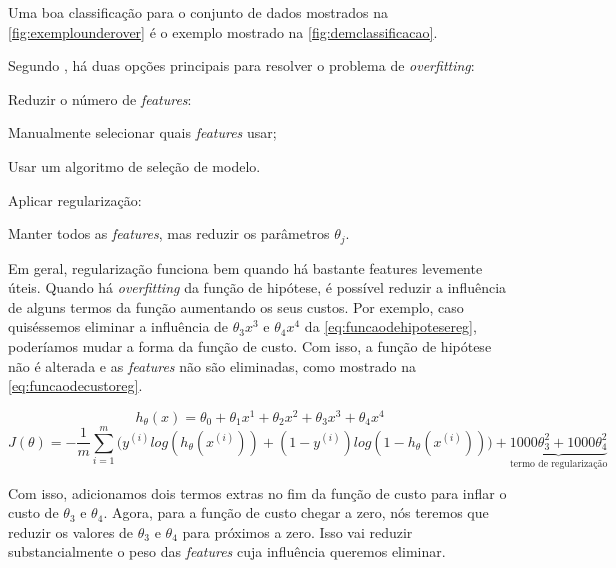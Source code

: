 Uma boa classificação para o conjunto de dados mostrados na \autoref{fig:exemplounderover} é o exemplo mostrado na \autoref{fig:demclassificacao}.

Segundo \cite{machinelearningcoursera}, há duas opções principais para resolver o problema de \textit{overfitting}:

\begin{alineas}
	\item Reduzir o número de \textit{features}:
		\begin{alineas}
			\item Manualmente selecionar quais \textit{features} usar;
			\item Usar um algoritmo de seleção de modelo.
		\end{alineas}
	\item Aplicar regularização:
		\begin{alineas}
			\item Manter todos as \textit{features}, mas reduzir os parâmetros $\theta_j$.
		\end{alineas}
\end{alineas}

Em geral, regularização funciona bem quando há bastante features levemente úteis. Quando há \textit{overfitting} da função de hipótese, é possível reduzir a influência de alguns termos da função aumentando os seus custos. Por exemplo, caso quiséssemos eliminar a influência de $\theta_3x^3$ e $\theta_4x^4$ da \autoref{eq:funcaodehipotesereg}, poderíamos mudar a forma da função de custo. Com isso, a função de hipótese não é alterada e as \textit{features} não são eliminadas, como mostrado na \autoref{eq:funcaodecustoreg}.

\begin{equation} \label{eq:funcaodehipotesereg}
h_{\theta}(x) = \theta_0 + \theta_1 x^1 + \theta_2 x^2 + \theta_3 x^3 + \theta_4 x^4
\end{equation}
\begin{equation} \label{eq:funcaodecustoreg}
J(\theta) = - \frac{1}{m}\sum\limits_{i=1}^{m}\Big( y^{(i)}log(h_{\theta}(x^{(i)})) + (1-y^{(i)})log(1 - h_{\theta}(x^{(i)})) \Big)
+ \underbrace{1000 \theta_3^2 + 1000 \theta_4^2}_\text{termo de regularização}
\end{equation}

Com isso, adicionamos dois termos extras no fim da função de custo para inflar o custo de $\theta_3$ e $\theta_4$. Agora, para a função de custo chegar a zero, nós teremos que reduzir os valores de $\theta_3$ e $\theta_4$ para próximos a zero. Isso vai reduzir substancialmente o peso das \textit{features} cuja influência queremos eliminar.

